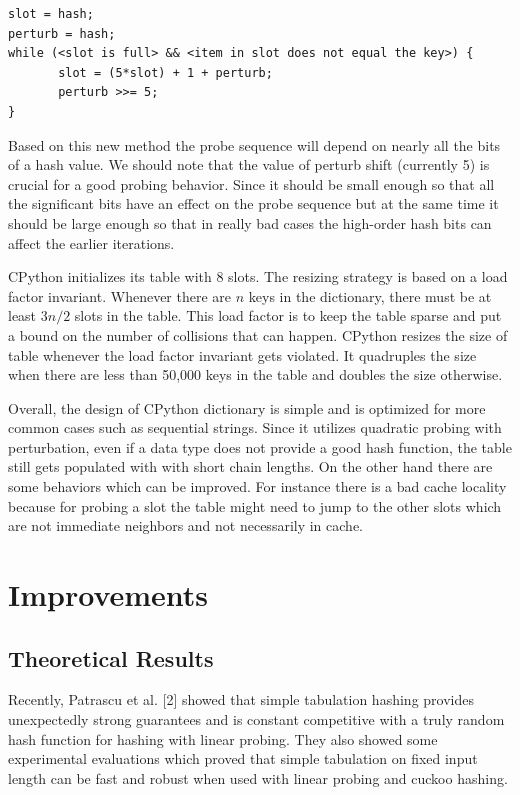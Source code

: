 \documentclass[11pt]{article}
\begin{document}
\begin{verbatim}
slot = hash;
perturb = hash;
while (<slot is full> && <item in slot does not equal the key>) {
       slot = (5*slot) + 1 + perturb;
       perturb >>= 5;
}
\end{verbatim}

Based on this new method the probe sequence will depend on nearly all the bits
of a hash value. We should note that the value of  perturb shift (currently 5)
is crucial for a good probing behavior. Since it should be small enough so that
all the significant bits have an  effect on the probe sequence but at the same
time it should be large enough so that in really bad cases the high-order hash
bits can affect the earlier iterations.

CPython initializes its table with 8 slots. The resizing strategy is based on a
load factor invariant. Whenever there are $n$ keys in the dictionary, there must
be at least $3n/2$ slots in the table. This load factor is to keep the table
sparse and put a bound on the number of collisions that can happen. CPython
resizes the size of table whenever the load factor invariant gets violated. It
quadruples the size when there are less than 50,000 keys in the table and
doubles the size otherwise. 

Overall, the design of CPython dictionary is simple and is optimized for more
common cases such as sequential strings. Since it utilizes quadratic probing
with perturbation, even if a data type does not provide a good hash function,
the table still gets populated with with short chain lengths.  On the other hand
there are some behaviors which can be improved. For instance there is a bad
cache locality because for probing a slot the table might need to jump to the
other slots which are not immediate neighbors and not necessarily in cache. 

\section{Improvements}

\subsection{Theoretical Results}
Recently, Patrascu et al. [2] showed that simple tabulation hashing provides unexpectedly strong guarantees and is constant competitive with a truly random hash function for hashing with linear probing. They also showed some experimental evaluations which proved that simple tabulation on fixed input length can be fast and robust when used with linear probing and cuckoo hashing. 
\end{document}
